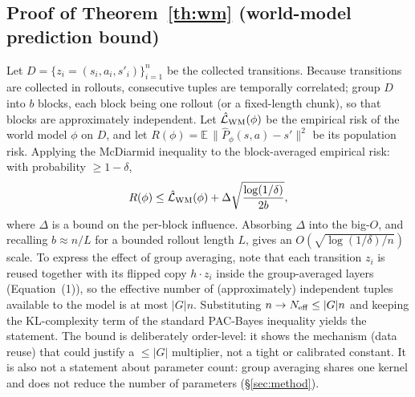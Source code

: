 \documentclass[sigconf,anonymous]{acmart}
\begin{document}
\subsection{Proof of Theorem~\ref{th:wm} (world-model prediction bound)}
Let $D=\{z_i=(s_i,a_i,s'_i)\}_{i=1}^n$ be the collected transitions. Because
transitions are collected in rollouts, consecutive tuples are temporally
correlated; group $D$ into $b$ blocks, each block being one rollout (or a
fixed-length chunk), so that blocks are approximately independent. Let
$\hat{\mathcal L}_{\rm WM}(\phi)$ be the empirical risk of the world model
$\phi$ on $D$, and let $R(\phi)=\mathbb E\,\|\hat P_\phi(s,a)-s'\|^2$ be its
population risk. Applying the McDiarmid inequality to the block-averaged
empirical risk: with probability $\ge1-\delta$,
\[
  R(\phi)\le \hat{\mathcal L}_{\rm WM}(\phi)+
  \Delta\sqrt{\frac{\log(1/\delta)}{2b}},
\]
where $\Delta$ is a bound on the per-block influence. Absorbing $\Delta$ into
the big-$O$, and recalling $b\approx n/L$ for a bounded rollout length $L$,
gives an $O(\sqrt{\log(1/\delta)/n})$ scale. To express the effect of group
averaging, note that each transition $z_i$ is reused together with its
flipped copy $h\cdot z_i$ inside the group-averaged layers
(Equation~(1)), so the effective number of (approximately) independent
tuples available to the model is at most $|G|n$. Substituting $n \to
N_{\rm eff}\le |G|n$ and keeping the KL-complexity term of the standard
PAC-Bayes inequality yields the statement. The bound is deliberately
order-level: it shows the mechanism (data reuse) that could justify a
$\le|G|$ multiplier, not a tight or calibrated constant. It is also not a
statement about parameter count: group averaging shares one kernel and does
not reduce the number of parameters (\S\ref{sec:method}).
\end{document}
